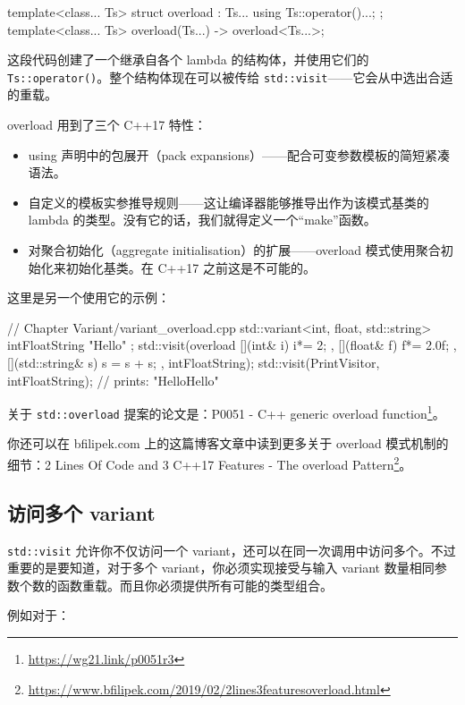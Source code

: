 \begin{codebox}[cpp]
template<class... Ts> struct overload : Ts... { using Ts::operator()...; };
template<class... Ts> overload(Ts...) -> overload<Ts...>;
\end{codebox}

这段代码创建了一个继承自各个 lambda 的结构体，并使用它们的 \texttt{Ts::operator()}。整个结构体现在可以被传给 \texttt{std::visit}——它会从中选出合适的重载。

overload 用到了三个 C++17 特性：

\begin{itemize}
\item using 声明中的包展开（pack expansions）——配合可变参数模板的简短紧凑语法。
\item 自定义的模板实参推导规则——这让编译器能够推导出作为该模式基类的 lambda 的类型。没有它的话，我们就得定义一个“make”函数。
\item 对聚合初始化（aggregate initialisation）的扩展——overload 模式使用聚合初始化来初始化基类。在 C++17 之前这是不可能的。
\end{itemize}

这里是另一个使用它的示例：

\begin{codebox}[cpp]
// Chapter Variant/variant_overload.cpp
std::variant<int, float, std::string> intFloatString { "Hello" };
std::visit(overload{
[](int& i) { i*= 2; },
[](float& f) { f*= 2.0f; },
[](std::string& s) { s = s + s; }
}, intFloatString);
std::visit(PrintVisitor, intFloatString);
// prints: "HelloHello"
\end{codebox}

关于 \texttt{std::overload} 提案的论文是：P0051 - C++ generic overload function\footnote{\url{https://wg21.link/p0051r3}}。

你还可以在 bfilipek.com 上的这篇博客文章中读到更多关于 overload 模式机制的细节：2 Lines Of Code and 3 C++17 Features - The overload Pattern\footnote{\url{https://www.bfilipek.com/2019/02/2lines3featuresoverload.html}}。

\subsection{访问多个 variant}

\texttt{std::visit} 允许你不仅访问一个 variant，还可以在同一次调用中访问多个。不过重要的是要知道，对于多个 variant，你必须实现接受与输入 variant 数量相同参数个数的函数重载。而且你必须提供所有可能的类型组合。

例如对于：

